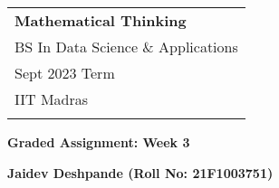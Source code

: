\documentclass[a4paper,12pt]{article} %
\begin{document}
\thispagestyle{empty} %

\begin{tabular}{p{15.5cm}} %
{\large \bf Mathematical Thinking} \\
BS In Data Science \& Applications  \\ Sept 2023 Term  \\ IIT Madras\\
\hline %
\\
\end{tabular} %

\vspace*{0.3cm} %

\begin{center} %
	{\Large \bf Graded Assignment: Week 3} %
	\vspace{2mm}
	
	{\bf Jaidev Deshpande (Roll No: 21F1003751)} %
		
\end{center}  

\vspace{0.4cm}
\end{document}
